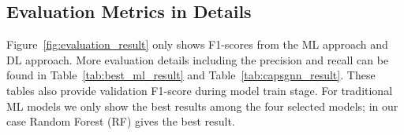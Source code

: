 \subsection{Evaluation Metrics in Details} \label{app:c}

Figure~\ref{fig:evaluation_result} only shows
F1-scores from the ML approach and DL approach. More evaluation details including the
precision and recall can be found in
Table~\ref{tab:best_ml_result} and
Table~\ref{tab:capsgnn_result}. These tables also provide validation
F1-score during model train stage. For traditional ML models we only
show the best results among the four selected models; in our case Random
Forest (RF) gives the best result.


\begin{table}[h]
    \caption{RF Results}
    \label{tab:best_ml_result}
    \centering
\end{table}
